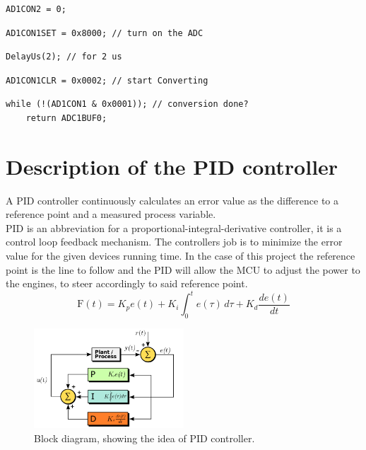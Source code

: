 \begin{lstlisting}
AD1CON2 = 0;
\end{lstlisting}

\begin{lstlisting}
AD1CON1SET = 0x8000; // turn on the ADC
\end{lstlisting}

\begin{lstlisting}
DelayUs(2); // for 2 us
\end{lstlisting}

\begin{lstlisting}
AD1CON1CLR = 0x0002; // start Converting
\end{lstlisting}

\begin{lstlisting}
while (!(AD1CON1 & 0x0001)); // conversion done?
    return ADC1BUF0;	
\end{lstlisting}

\section {Description of the PID controller} 
A PID controller continuously calculates an error value as the difference to a reference point and a measured process variable.\\
PID is an abbreviation for a proportional-integral-derivative controller, it is a control loop feedback mechanism. The controllers job is to minimize the error value for the given devices running time. In the case of this project the reference point is the line to follow and the PID will allow the MCU to adjust the power to the engines, to steer accordingly to said reference point.
$$\mathrm{F}(t)=K_p{e(t)} + K_{i}\int_{0}^{t}{e(\tau)}\,{d\tau} + K_{d}\frac{de(t)}{dt}$$

\begin{figure}[h!]
  \centering
  \includegraphics[width=0.5\textwidth]{figures/PID_block.png}  
\caption{Block diagram, showing the idea of PID controller.}   
  \label{PID controller}
\end{figure}


